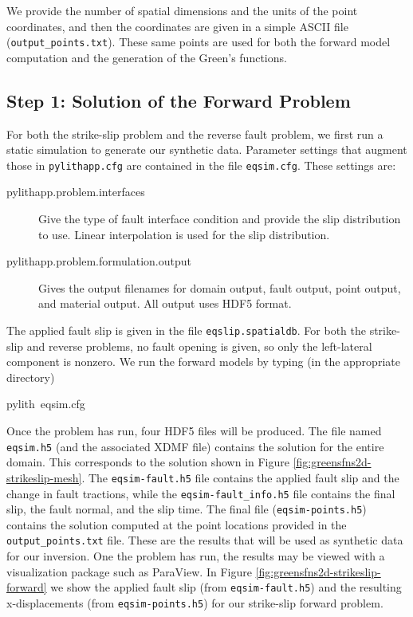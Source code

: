 We provide the number of spatial dimensions and the units of the point
coordinates, and then the coordinates are given in a simple ASCII
file (\texttt{output\_points.txt}). These same points are used for
both the forward model computation and the generation of the Green's
functions.


\subsection{Step 1: Solution of the Forward Problem}

For both the strike-slip problem and the reverse fault problem, we
first run a static simulation to generate our synthetic data. Parameter
settings that augment those in \texttt{pylithapp.cfg} are contained
in the file \texttt{eqsim.cfg}. These settings are:
\begin{description}
\item [{pylithapp.problem.interfaces}] Give the type of fault interface
condition and provide the slip distribution to use. Linear interpolation
is used for the slip distribution.
\item [{pylithapp.problem.formulation.output}] Gives the output filenames
for domain output, fault output, point output, and material output.
All output uses HDF5 format.
\end{description}
The applied fault slip is given in the file \texttt{eqslip.spatialdb}.
For both the strike-slip and reverse problems, no fault opening is
given, so only the left-lateral component is nonzero. We run the forward
models by typing (in the appropriate directory)
\begin{lyxcode}
pylith~eqsim.cfg
\end{lyxcode}
Once the problem has run, four HDF5 files will be produced. The file
named \texttt{eqsim.h5} (and the associated XDMF file) contains the
solution for the entire domain. This corresponds to the solution shown
in Figure \ref{fig:greensfns2d-strikeslip-mesh}. The \texttt{eqsim-fault.h5}
file contains the applied fault slip and the change in fault tractions,
while the \texttt{eqsim-fault\_info.h5} file contains the final slip,
the fault normal, and the slip time. The final file (\texttt{eqsim-points.h5})
contains the solution computed at the point locations provided in
the \texttt{output\_points.txt} file. These are the results that will
be used as synthetic data for our inversion. One the problem has run,
the results may be viewed with a visualization package such as ParaView.
In Figure \ref{fig:greensfns2d-strikeslip-forward} we show the applied
fault slip (from \texttt{eqsim-fault.h5}) and the resulting x-displacements
(from \texttt{eqsim-points.h5}) for our strike-slip forward problem.

